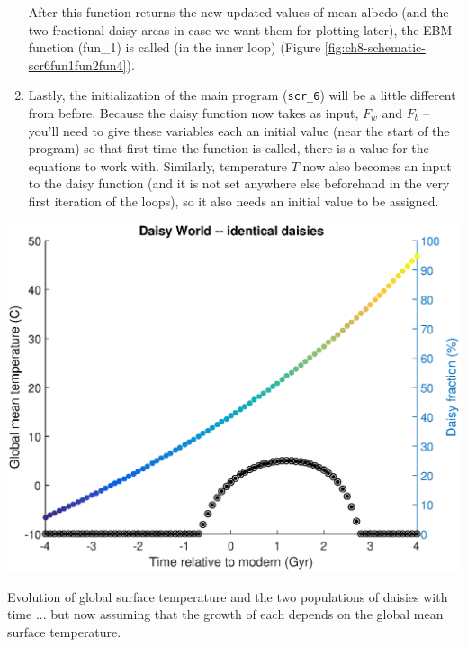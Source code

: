 \documentclass{tufte-book} %
\begin{document}
\begin{enumerate}
After this function returns the new updated values of mean albedo (and the two fractional daisy areas in case we want them for plotting later), the EBM function (\textsf{fun\_1}) is called (in the inner loop) (Figure \ref{fig:ch8-schematic-scr6fun1fun2fun4}).

\item Lastly, the initialization of the main program (\texttt{scr\_6}) will be a little different from before. Because the daisy function now takes as input, \(F_{w}\) and \(F_{b}\) -- you'll need to give these variables each an initial value (near the start of the program) so that first time the function is called, there is a value for the equations to work with. Similarly, temperature \(T\) now also becomes an input to the daisy function (and it is not set anywhere else beforehand in the very first iteration of the loops), so it also needs an initial value to be assigned.

\end{enumerate}

\begin{marginfigure}[-0.5in]
\includegraphics[width=\linewidth]{ch4-daisy-model2.eps}
\caption{Evolution of global surface temperature and the two populations of daisies with time ... but now assuming that the growth of each depends on the global mean surface temperature.}
\label{fig:ch4-daisy-model2}
\end{marginfigure}
\end{document}
